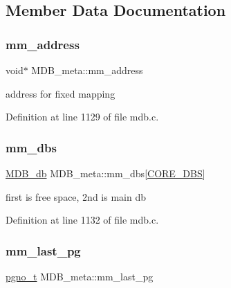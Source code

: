 \subsection{Member Data Documentation}
\mbox{\label{struct_m_d_b__meta_a22a6641d311f707a99231d350308febc}} 
\subsubsection{\texorpdfstring{mm\+\_\+address}{mm\_address}}
{\footnotesize\ttfamily void$\ast$ M\+D\+B\+\_\+meta\+::mm\+\_\+address}

address for fixed mapping 

Definition at line 1129 of file mdb.\+c.

\mbox{\label{struct_m_d_b__meta_a16889e9232601af59a9363268e1fe6cd}} 
\subsubsection{\texorpdfstring{mm\+\_\+dbs}{mm\_dbs}}
{\footnotesize\ttfamily \mbox{\hyperlink{struct_m_d_b__db}{M\+D\+B\+\_\+db}} M\+D\+B\+\_\+meta\+::mm\+\_\+dbs\mbox{[}\mbox{\hyperlink{group__internal_ga9c5573d169b885743bc9208c23c7e82b}{C\+O\+R\+E\+\_\+\+D\+BS}}\mbox{]}}

first is free space, 2nd is main db 

Definition at line 1132 of file mdb.\+c.

\mbox{\label{struct_m_d_b__meta_a794e3644abac188a4b57b3f76ee7af40}} 
\subsubsection{\texorpdfstring{mm\+\_\+last\+\_\+pg}{mm\_last\_pg}}
{\footnotesize\ttfamily \mbox{\hyperlink{group__internal_gadb65f0424c9d3827bf6409087ad555cd}{pgno\+\_\+t}} M\+D\+B\+\_\+meta\+::mm\+\_\+last\+\_\+pg}

